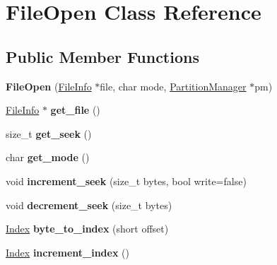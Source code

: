 \hypertarget{classFileOpen}{}\section{File\+Open Class Reference}
\label{classFileOpen}
\subsection*{Public Member Functions}
\begin{DoxyCompactItemize}
\item 
\mbox{\label{classFileOpen_a387c8980a812856a3633ff162c1c1af4}} 
{\bfseries File\+Open} (\mbox{\hyperlink{classFileInfo}{File\+Info}} $\ast$file, char mode, \mbox{\hyperlink{classPartitionManager}{Partition\+Manager}} $\ast$pm)
\item 
\mbox{\label{classFileOpen_ad1451c997a9300d20ba8e1af28fda08c}} 
\mbox{\hyperlink{classFileInfo}{File\+Info}} $\ast$ {\bfseries get\+\_\+file} ()
\item 
\mbox{\label{classFileOpen_a8acd2b1d7f9cb2fe6030a75538ce62bb}} 
size\+\_\+t {\bfseries get\+\_\+seek} ()
\item 
\mbox{\label{classFileOpen_a716c5d9b534be9cac550f3e64620514a}} 
char {\bfseries get\+\_\+mode} ()
\item 
\mbox{\label{classFileOpen_a8b178b10d2081d8c64a1218f11b9265a}} 
void {\bfseries increment\+\_\+seek} (size\+\_\+t bytes, bool write=false)
\item 
\mbox{\label{classFileOpen_a7e1fd46a093bef3a650e1d1e4d431cf7}} 
void {\bfseries decrement\+\_\+seek} (size\+\_\+t bytes)
\item 
\mbox{\label{classFileOpen_a6d1374e052e3d9ba190e2797d9ae06a0}} 
\mbox{\hyperlink{structindex}{Index}} {\bfseries byte\+\_\+to\+\_\+index} (short offset)
\item 
\mbox{\label{classFileOpen_abd29158f55f135ada0c5a0f25ee5ace6}} 
\mbox{\hyperlink{structindex}{Index}} {\bfseries increment\+\_\+index} ()
\item 
\mbox{\label{classFileOpen_a1523bffc4bc58984b53b309eb92cc8b9}} 

\end{DoxyCompactItemize}
